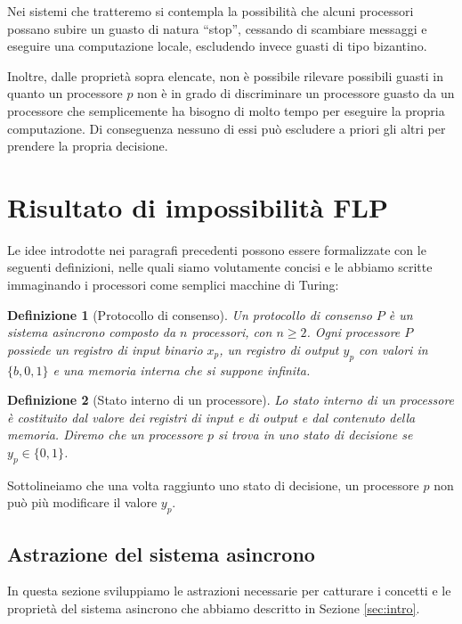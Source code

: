 \documentclass{article}
\newtheorem{definizione}{Definizione}
\begin{document}
Nei sistemi che tratteremo si contempla la possibilit\`a che alcuni
processori possano subire un guasto di natura ``stop'', cessando di
scambiare messaggi e eseguire una computazione locale, escludendo
invece guasti di tipo bizantino.

Inoltre, dalle propriet\`a sopra elencate, non \`e possibile rilevare
possibili guasti in quanto un processore $p$ non \`e in grado di
discriminare un processore guasto da un processore che semplicemente
ha bisogno di molto tempo per eseguire la propria computazione. Di
conseguenza nessuno di essi pu\`o escludere a priori gli altri per
prendere la propria decisione.

\section{Risultato di impossibilit\`a FLP}

Le idee introdotte nei paragrafi precedenti possono essere
formalizzate con le seguenti definizioni, nelle quali siamo
volutamente concisi e le abbiamo scritte immaginando i processori come
semplici macchine di Turing:

\begin{definizione}[Protocollo di consenso]
  Un protocollo di consenso $P$ è un sistema asincrono composto da $n$
  processori, con $n\geq2$. Ogni processore $P$ possiede un registro
  di input binario $x_p$, un registro di output $y_p$ con valori in
  $\{b,0,1\}$ e una memoria interna che si suppone infinita.
\end{definizione}

\begin{definizione}[Stato interno di un processore]
  Lo stato interno di un processore è costituito dal valore dei
  registri di input e di output e dal contenuto della memoria.  Diremo
  che un processore $p$ si trova in uno stato di decisione se $y_p \in
  \lbrace 0,1 \rbrace$. 
\end{definizione}

Sottolineiamo che una volta raggiunto uno stato di decisione, un
processore $p$ non pu\`o pi\`u modificare il valore $y_p$.

\subsection{Astrazione del sistema asincrono}

In questa sezione sviluppiamo le astrazioni necessarie per catturare i
concetti e le propriet\`a del sistema asincrono che abbiamo descritto
in Sezione \ref{sec:intro}.
\end{document}

